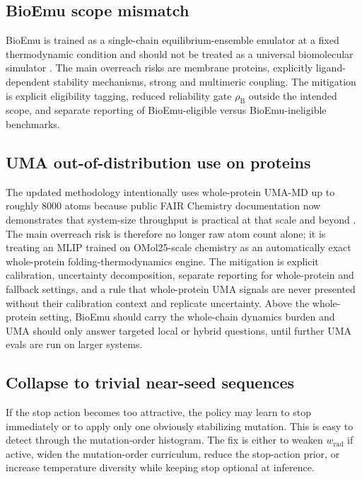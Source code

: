 \documentclass[11pt]{article}
\begin{document}
\subsection{BioEmu scope mismatch}

BioEmu is trained as a single-chain equilibrium-ensemble emulator at a fixed thermodynamic condition and should not be treated as a universal biomolecular simulator \citep{lewis2024bioemu}. The main overreach risks are membrane proteins, explicitly ligand-dependent stability mechanisms, strong and multimeric coupling. The mitigation is explicit eligibility tagging, reduced reliability gate $\rho_{\mathrm B}$ outside the intended scope, and separate reporting of BioEmu-eligible versus BioEmu-ineligible benchmarks.

\subsection{UMA out-of-distribution use on proteins}

The updated methodology intentionally uses whole-protein UMA-MD up to roughly $8000$ atoms because public FAIR Chemistry documentation now demonstrates that system-size throughput is practical at that scale and beyond \citep{fairchem2025github}. The main overreach risk is therefore no longer raw atom count alone; it is treating an MLIP trained on OMol25-scale chemistry as an automatically exact whole-protein folding-thermodynamics engine. The mitigation is explicit calibration, uncertainty decomposition, separate reporting for whole-protein and fallback settings, and a rule that whole-protein UMA signals are never presented without their calibration context and replicate uncertainty. Above the whole-protein setting, BioEmu should carry the whole-chain dynamics burden and UMA should only answer targeted local or hybrid questions, until further UMA evals are run on larger systems. 

\subsection{Collapse to trivial near-seed sequences}

If the stop action becomes too attractive, the policy may learn to stop immediately or to apply only one obviously stabilizing mutation. This is easy to detect through the mutation-order histogram. The fix is either to weaken $w_{\mathrm{rad}}$ if active, widen the mutation-order curriculum, reduce the stop-action prior, or increase temperature diversity while keeping stop optional at inference.
\end{document}
